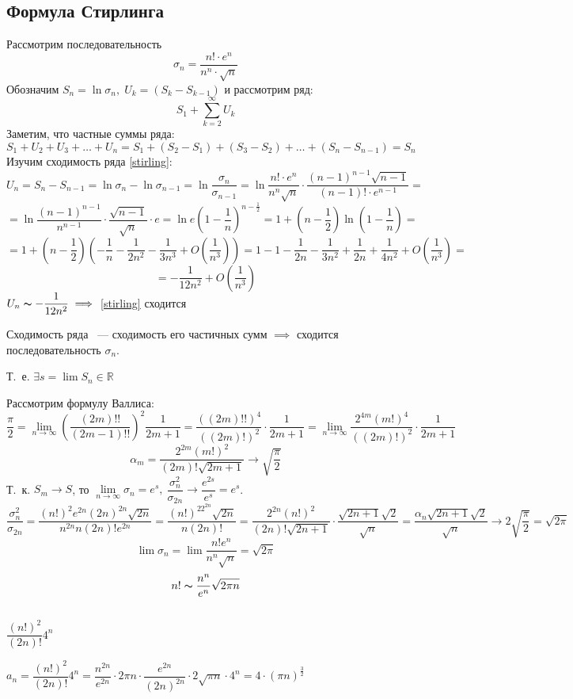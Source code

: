 \documentclass[../../main.tex]{subfiles}
\begin{document}
\subsection{Формула Стирлинга}
Рассмотрим последовательность
\[\sigma_n = \dfrac{n! \cdot e^n}{n^n \cdot \sqrt{n}}\]
Обозначим $ S_n = \ln{\sigma_n},\; U_k = (S_k - S_{k-1})$ и рассмотрим ряд:
\begin{equation}
\label{stirling} S_1 + \sum\limits_{k=2}^\infty U_k
\end{equation}
Заметим, что частные суммы ряда:
\[ 
S_1 + U_2 + U_3 + \ldots + U_n = S_1 + \left(S_2 - S_1\right) + 
\left(S_3 - S_2\right) + \ldots + \left(S_n - S_{n - 1}\right) = S_n
\]
Изучим сходимость ряда \eqref{stirling}:
\[
U_n = S_n - S_{n - 1} = \ln\sigma_n - \ln\sigma_{n - 1} = 
\ln\dfrac{\sigma_n}{\sigma_{n - 1}} = \ln\dfrac{n! \cdot e^n}{n^n\sqrt{n}}
\cdot \dfrac{(n - 1)^{n - 1}\sqrt{n - 1}}{(n - 1)! \cdot e^{n -1}} =
\] 
\[
= \ln\dfrac{(n - 1)^{n - 1}}{n^{n - 1}} \cdot \dfrac{\sqrt{n - 1}}{\sqrt{n}}
\cdot e = \ln e \left(1 - \dfrac{1}{n} \right)^{n - \frac{1}{2}} = 
1 + \left(n - \dfrac{1}{2} \right) \ln \left( 1 - \dfrac{1}{n} \right) =
\]
\[
= 1 + \left( n - \dfrac{1}{2} \right)\left(-\dfrac{1}{n} - \dfrac{1}{2n^2}
- \dfrac{1}{3n^3} + O\left(\dfrac{1}{n^3} \right) \right) = 
1 - 1 - \dfrac{1}{2n} - \dfrac{1}{3n^2} + \dfrac{1}{2n} + \dfrac{1}{4n^2}
+ O\left( \dfrac{1}{n^3} \right) = 
\]
\[= -\dfrac{1}{12n^2} + O\left( \dfrac{1}{n^3}\right)\]
$U_n \thicksim -\dfrac{1}{12n^2} \implies$  \eqref{stirling} сходится

Сходимость ряда ~--- сходимость его частичных сумм $\implies$
сходится последовательность $\sigma_n$.

Т.~е. $ \exists s = \lim S_n \in \mathbb{R}$

Рассмотрим формулу Валлиса:
\[
\dfrac{\pi}{2} = \lim\limits_{n \to \infty} \left( \dfrac{(2m)!!}{(2m - 1)!!}
\right)^2 \dfrac{1}{2m + 1} = \dfrac{((2m)!!)^4}{((2m)!)^2} \cdot
\dfrac{1}{2m + 1} = \lim\limits_{n \to \infty} \dfrac{2^{4m}(m!)^4}{((2m)!)^2} 
\cdot \dfrac{1}{2m + 1}
\]
\[
\alpha_m = \dfrac{2^{2m}(m!)^2}{(2m)!\sqrt{2m + 1}} \to \sqrt{\dfrac{\pi}{2}}
\]
Т.~к. $ S_m \to S $, то $ \lim\limits_{n \to \infty} \sigma_n = e^s, \ 
\dfrac{\sigma_n^2}{\sigma_{2n}} \to \dfrac{e^{2s}}{e^s} = e^s $.
\[
\dfrac{\sigma_n^2}{\sigma_{2n}} = 
\dfrac{(n!)^2e^{2n}(2n)^{2n}\sqrt{2n}}{n^{2n}n(2n)!e^{2n}} =
\dfrac{(n!)^22^{2n}\sqrt{2n}}{n(2n)!} =
\dfrac{2^{2n}(n!)^2}{(2n)!\sqrt{2n + 1}} \cdot 
\dfrac{\sqrt{2n+1}\sqrt{2}}{\sqrt{n}} = 
\dfrac{\alpha_n\sqrt{2n + 1}\sqrt{2}}{\sqrt{n}} \to
2\sqrt{\dfrac{\pi}{2}} = \sqrt{2\pi}
\]
\[
\lim \sigma_n = \lim \dfrac{n!e^n}{n^n \sqrt{n}} = \sqrt{2\pi}
\]
\[
n! \thicksim \dfrac{n^n}{e^n}\sqrt{2\pi n}
\]
\begin{example}
$ $

$\dfrac{(n!)^2}{(2n)!}4^n$

$a_n = \dfrac{(n!)^2}{(2n)!}4^n = \dfrac{n^{2n}}{e^{2n}} 
\cdot 2\pi n \cdot \dfrac{e^{2n}}{(2n)^{2n}} \cdot 2 \sqrt{\pi n}
\cdot 4^n = 4 \cdot (\pi n)^{\frac{3}{2}}
$
\end{example}
\end{document}
